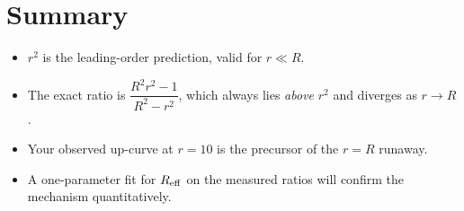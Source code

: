 \documentclass[11pt]{article}
\begin{document}
\section*{Summary}

\begin{itemize}
\item $r^2$ is the leading-order prediction, valid for $r\ll R$.
\item The exact ratio is $\dfrac{R^2 r^2 - 1}{R^2 - r^2}$, which always lies
\emph{above} $r^2$ and diverges as $r\to R$.
\item Your observed up-curve at $r=10$ is the precursor of the $r=R$ runaway.
\item A one-parameter fit for $R_{\rm eff}$ on the measured ratios will confirm
the mechanism quantitatively.
\end{itemize}
\end{document}
